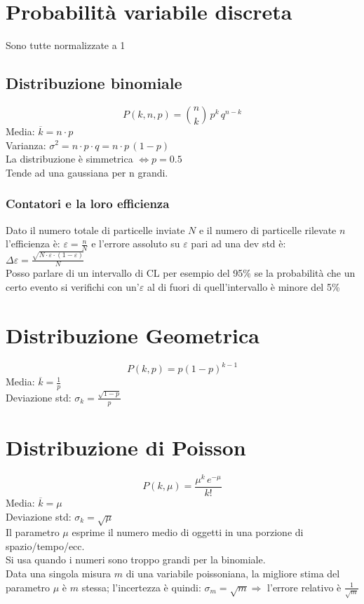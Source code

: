 \documentclass[11pt]{article}
\begin{document}
    \section{Probabilità variabile discreta}
    Sono tutte normalizzate a 1

    \subsection{Distribuzione binomiale}
    \[ P(k, n, p) = \binom{n}{k} \, p^k \, q^{n - k} \]
    Media: $ \overline{k} = n \cdot p $ \\
    Varianza: $ \sigma^2 = n \cdot p \cdot q = n \cdot p \, (1 - p) $ \\
    La distribuzione è simmetrica $ \Leftrightarrow p = 0.5$ \\
    Tende ad una gaussiana per n grandi.

    \subsubsection{Contatori e la loro efficienza} %
    Dato il numero totale di particelle inviate $N$ e il numero di particelle rilevate $n$ l'efficienza è:
    $\varepsilon = \frac{n}{N} $ e l'errore assoluto su $\varepsilon$ pari ad una dev std è:
    $\Delta \varepsilon = \frac{\sqrt {N \cdot \varepsilon \cdot (1 - \varepsilon)}}{N}  $ \\
    Posso parlare di un intervallo di CL per esempio del 95\% se la probabilità che un certo evento si verifichi con
    un'$\varepsilon$ al di fuori di quell'intervallo è minore del 5\%

    \section{Distribuzione Geometrica}
    \[ P(k, p) = p(1-p)^{k - 1} \]
    Media: $ \overline{k} = \frac{1}{p} $ \\
    Deviazione std: $ \sigma_k = \frac{\sqrt {1 - p}}{p} $

    \section{Distribuzione di Poisson}
    \[ P(k, \mu) = \frac{\mu^k \, e^{-\mu}}{k!} \]
    Media: $ \overline{k} = \mu $ \\
    Deviazione std: $ \sigma_k = \sqrt {\mu} $ \\[.5\baselineskip]
    Il parametro $\mu$ esprime il numero medio di oggetti in una porzione di spazio/tempo/ecc. \\
    Si usa quando i numeri sono troppo grandi per la binomiale. \\
    Data una singola misura $m$ di una variabile poissoniana, la migliore stima del parametro $\mu$ è $m$ stessa;
    l'incertezza è quindi: $ \sigma_m = \sqrt {m} \Rightarrow $ l'errore relativo è $\frac{1}{\sqrt{m}}$
\end{document}
